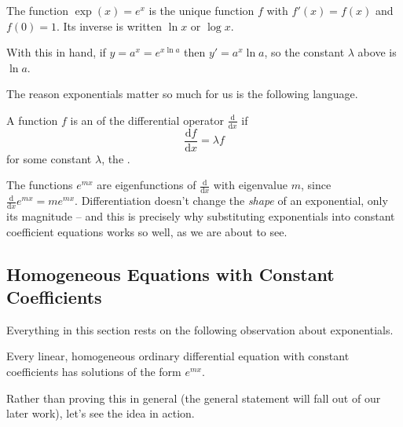 \begin{definition}
	The function $\exp(x) = e^x$ is the unique function $f$ with $f'(x) = f(x)$ and $f(0) = 1$. Its inverse is written $\ln x$ or $\log x$.
\end{definition}

With this in hand, if $y = a^x = e^{x \ln a}$ then $y' = a^x \ln a$, so the constant $\lambda$ above is $\ln a$.

The reason exponentials matter so much for us is the following language.

\begin{definition}[Eigenfunction]
	A function $f$ is an  of the differential operator $\frac{\mathrm{d}}{\mathrm{d}x}$ if
	$$
	\frac{\mathrm{d}f}{\mathrm{d}x} = \lambda f
	$$
	for some constant $\lambda$, the .
\end{definition}

The functions $e^{mx}$ are eigenfunctions of $\frac{\mathrm{d}}{\mathrm{d}x}$ with eigenvalue $m$, since $\frac{\mathrm{d}}{\mathrm{d}x} e^{mx} = m e^{mx}$. Differentiation doesn't change the \emph{shape} of an exponential, only its magnitude -- and this is precisely why substituting exponentials into constant coefficient equations works so well, as we are about to see.

\subsection{Homogeneous Equations with Constant Coefficients}

Everything in this section rests on the following observation about exponentials.

\begin{proposition}
	Every linear, homogeneous ordinary differential equation with constant coefficients has solutions of the form $e^{mx}$.
\end{proposition}

Rather than proving this in general (the general statement will fall out of our later work), let's see the idea in action.

